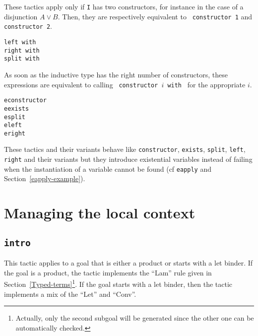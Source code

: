 \begin{coq_example*}
\begin{Variants}
  These tactics apply only if {\tt I} has two constructors, for instance
  in the case of a
  disjunction $A\lor B$. Then, they are respectively equivalent to {\tt
    constructor 1} and {\tt constructor 2}.

  \ErrMsg {}

\item {\tt left with \bindinglist}\\
      {\tt right with \bindinglist}\\
      {\tt split with \bindinglist}

  As soon as the inductive type has the right number of constructors,
    these expressions are equivalent to calling {\tt
    constructor $i$ with \bindinglist} for the appropriate $i$.

\item \texttt{econstructor}\\
      \texttt{eexists}\\
      \texttt{esplit}\\
      \texttt{eleft}\\
      \texttt{eright}

  These tactics and their variants behave like \texttt{constructor},
  \texttt{exists}, \texttt{split}, \texttt{left}, \texttt{right} and
  their variants but they introduce existential variables instead of
  failing when the instantiation of a variable cannot be found (cf
  \texttt{eapply} and Section~\ref{eapply-example}).

\end{Variants}

\section{Managing the local context}

\subsection{\tt intro}
\label{intro}

This tactic applies to a goal that is either a product or starts with
a let binder. If the goal is a product, the tactic implements the
``Lam'' rule given in
Section~\ref{Typed-terms}\footnote{Actually, only the second subgoal will be
generated since the other one can be automatically checked.}.  If the
goal starts with a let binder, then the tactic implements a mix of the
``Let'' and ``Conv''.


\end{coq_example*}
